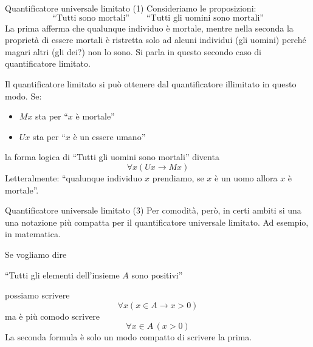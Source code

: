 \documentclass[aspectratio=169,10pt,dvipsnames,xcolor=table]{beamer}
\begin{document}
\begin{frame}{Quantificatore universale limitato (1)}
    Consideriamo le proposizioni:
    \[
        \text{``Tutti sono mortali''} \qquad \text{``Tutti gli uomini sono mortali''}
    \]
    La prima afferma che qualunque individuo è mortale,  mentre nella seconda la proprietà di essere mortali è ristretta solo ad alcuni individui (gli uomini) perché magari altri (gli dei?) non lo sono. Si parla in questo secondo caso di \alert{quantificatore limitato}.

    \medskip
    Il quantificatore limitato si può ottenere dal quantificatore illimitato in questo modo. Se:
    \begin{itemize}
        \item $Mx$ sta per ``$x$ è mortale''
        \item $Ux$ sta per ``$x$ è un essere umano''
    \end{itemize}
    la forma logica di ``Tutti gli uomini sono mortali'' diventa
    \[
        \forall x (Ux \to Mx)
    \]
    Letteralmente: ``qualunque individuo $x$ prendiamo, se $x$ è un uomo allora $x$ è mortale''.
\end{frame}

\begin{frame}{Quantificatore universale limitato (3)}
    Per comodità, però, in certi ambiti si una una notazione più compatta per il quantificatore universale limitato. Ad esempio, in matematica.
    \begin{example}
        Se vogliamo dire
        \begin{center}
            ``Tutti gli elementi dell'insieme $A$ sono positivi''
        \end{center}
        possiamo scrivere
        \[
            \forall x (x \in A \to x > 0)
        \]
        ma è più comodo scrivere
        \[
            \forall x \in A \, (x > 0)
        \]
        La seconda formula è solo un modo compatto di scrivere la prima.
    \end{example}
\end{frame}
\end{document}
